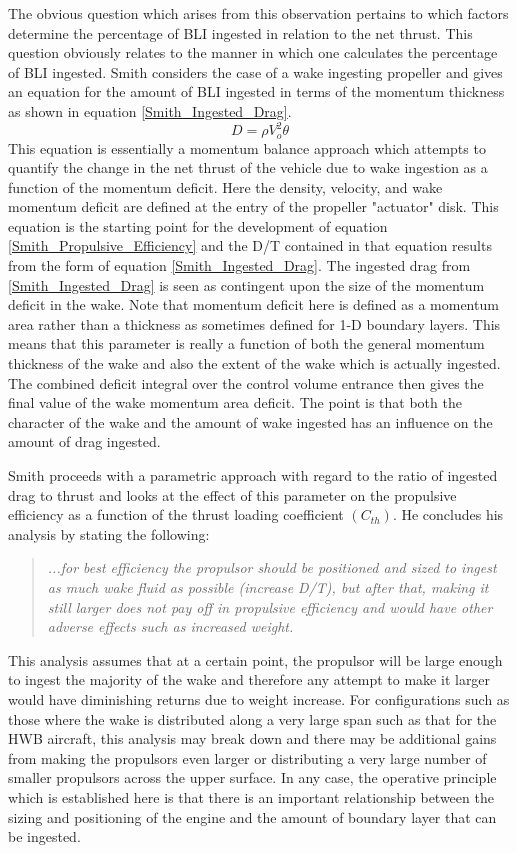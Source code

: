 The obvious question which arises from this observation pertains to which factors determine the percentage of BLI ingested in relation to the net thrust.  This question obviously relates to the manner in which one calculates the percentage of BLI ingested.  
Smith \cite{Smith1993} considers the case of a wake ingesting propeller and gives an equation for the amount of BLI ingested in terms of the momentum thickness as shown in equation \ref{Smith_Ingested_Drag}.
   \begin{equation}D = \rho V_o^2 \theta \label{Smith_Ingested_Drag}\end{equation}%
This equation is essentially a momentum balance approach which attempts to quantify the change in the net thrust of the vehicle due to wake ingestion as a function of the momentum deficit.  Here the density, velocity, and wake momentum deficit are defined at the entry of the propeller "actuator" disk.  This equation is the starting point for the development of equation \ref{Smith_Propulsive_Efficiency} and the D/T contained in that equation results from the form of equation \ref{Smith_Ingested_Drag}.  The ingested drag from \ref{Smith_Ingested_Drag} is seen as contingent upon the size of the momentum deficit in the wake.  Note that momentum deficit here is defined as a momentum area rather than a thickness as sometimes defined for 1-D boundary layers.  This means that this parameter is really a function of both the general momentum thickness of the wake and also the extent of the wake which is actually ingested.  The combined deficit integral over the control volume entrance then gives the final value of the wake momentum area deficit.  The point is that both the character of the wake and the amount of wake ingested has an influence on the amount of drag ingested.

Smith proceeds with a parametric approach with regard to the ratio of ingested drag to thrust and looks at the effect of this parameter on the propulsive efficiency as a function of the thrust loading coefficient $(C_{th})$.  He concludes his analysis by stating the following:  
\begin{quote}
 \textit{...for best efficiency the propulsor should be positioned and sized to ingest as much wake fluid as possible (increase D/T), but after that, making it still larger does not pay off in propulsive efficiency and would have other adverse effects such as increased weight.}
\end{quote}
This analysis assumes that at a certain point, the propulsor will be large enough to ingest the majority of the wake and therefore any attempt to make it larger would have diminishing returns due to weight increase.  For configurations such as those where the wake is distributed along a very large span such as that for the HWB aircraft, this analysis may break down and there may be additional gains from making the propulsors even larger or distributing a very large number of smaller propulsors across the upper surface.  In any case, the operative principle which is established here is that there is an important relationship between the sizing and positioning of the engine and the amount of boundary layer that can be ingested.  

